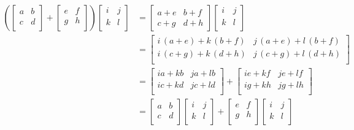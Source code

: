 \documentclass[../MathsNotesBase.tex]{subfiles}
\begin{document}
{		\begin{align*}
			\left(
			\begin{bmatrix}
			a & b \\
			c & d \\
			\end{bmatrix}
			+
			\begin{bmatrix}
			e & f \\
			g & h \\
			\end{bmatrix}
			\right)
			\begin{bmatrix}
			i & j \\
			k & l \\
			\end{bmatrix}
			&=
			\begin{bmatrix}
			a+e & b+f\\
			c+g & d+h
			\end{bmatrix}
			\begin{bmatrix}
			i & j \\
			k & l \\
			\end{bmatrix}
			\\
			&=
			\begin{bmatrix}
			i\,{\left(a+e\right)}+k\,{\left(b+f\right)} & j\,{\left(a+e\right)}+l\,{\left(b+f\right)}\\
			i\,{\left(c+g\right)}+k\,{\left(d+h\right)} & j\,{\left(c+g\right)}+l\,{\left(d+h\right)}\\
			\end{bmatrix}
			\\
			&=
			\begin{bmatrix}
			ia + kb & ja + lb\\
			ic + kd & jc + ld\\
			\end{bmatrix}
			+
			\begin{bmatrix}
			ie + kf & je + lf\\
			ig + kh & jg + lh\\
			\end{bmatrix}
			\\
			&=
			\begin{bmatrix}
			a & b \\
			c & d \\
			\end{bmatrix}
			\begin{bmatrix}
			i & j \\
			k & l \\
			\end{bmatrix}
			+
			\begin{bmatrix}
			e & f \\
			g & h \\
			\end{bmatrix}
			\begin{bmatrix}
			i & j \\
			k & l \\
			\end{bmatrix}
		\end{align*}
		
}
\end{document}
